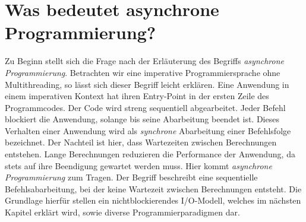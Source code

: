 \section{Was bedeutet asynchrone Programmierung?}
Zu Beginn stellt sich die Frage nach der Erläuterung des Begriffs \textit{asynchrone Programmierung}. Betrachten wir eine imperative Programmiersprache ohne Multithreading, so lässt sich dieser Begriff leicht erklären. Eine Anwendung in einem imperativen Kontext hat ihren Entry-Point in der ersten Zeile des Programmcodes. Der Code wird streng sequentiell abgearbeitet. Jeder Befehl blockiert die Anwendung, solange bis seine Abarbeitung beendet ist. Dieses Verhalten einer Anwendung wird als \textit{synchrone} Abarbeitung einer Befehlsfolge bezeichnet. Der Nachteil ist hier, dass Wartezeiten zwischen Berechnungen entstehen. Lange Berechnungen reduzieren die Performance der Anwendung, da stets auf ihre Beendigung gewartet werden muss. Hier kommt \textit{asynchrone Programmierung} zum Tragen. Der Begriff beschreibt eine sequentielle Befehlsabarbeitung, bei der keine Wartezeit zwischen Berechnungen entsteht. Die Grundlage hierfür stellen ein nichtblockierendes I/O-Modell, welches im nächsten Kapitel erklärt wird, sowie diverse Programmierparadigmen dar.

